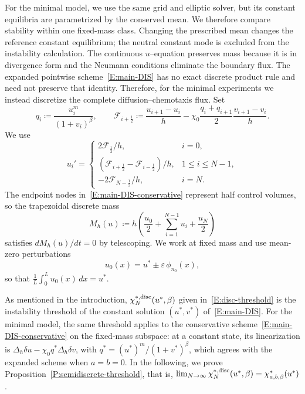 \documentclass[11pt]{article} %
\theoremstyle{remark}
\theoremstyle{remark}
\numberwithin{equation}{section}
\numberwithin{figure}{section}
\numberwithin{table}{section}
\begin{document}
For the minimal model, we use the same grid and elliptic solver, but its
constant equilibria are parametrized by the conserved mean. We therefore compare
stability within one fixed-mass class. Changing the prescribed mean changes the
reference constant equilibrium; the neutral constant mode is excluded from the
instability calculation. The continuous $u$--equation preserves mass because it
is in divergence form and the Neumann conditions eliminate the boundary flux.
The expanded pointwise scheme~\eqref{E:main-DIS} has no exact discrete product
rule and need not preserve that identity. Therefore, for the minimal experiments
we instead discretize the complete diffusion--chemotaxis flux. Set
\[
  q_i\coloneqq\frac{u_i^m}{(1+v_i)^\beta},
  \qquad
  \mathcal{F}_{i+\frac12}
  \coloneqq
  \frac{u_{i+1}-u_i}{h}
  -\chi_0\frac{q_i+q_{i+1}}{2}\frac{v_{i+1}-v_i}{h}.
\]
We use
\begin{equation}\label{E:main-DIS-conservative}
  u_i'=
  \begin{cases}
    2\mathcal{F}_{\frac12}/h,                                       & i=0,           \\
    \left(\mathcal{F}_{i+\frac12}-\mathcal{F}_{i-\frac12}\right)/h, & 1\le i\le N-1, \\
    -2\mathcal{F}_{N-\frac12}/h,                                    & i=N.
  \end{cases}
\end{equation}
The endpoint nodes in~\eqref{E:main-DIS-conservative} represent half control
volumes, so the trapezoidal discrete mass
\[
  M_h(u)\coloneqq
  h\left(\frac{u_0}{2}+\sum_{i=1}^{N-1}u_i+\frac{u_N}{2}\right)
\]
satisfies $dM_h(u)/dt = 0$ by telescoping.
We work at fixed mass and use mean-zero perturbations
\[
  u_0(x)=u^*\pm \varepsilon\,\phi_{n_0}(x),
\]
so that $\frac{1}{L}\int_0^L u_0(x)\,dx = u^*$.

As mentioned in the introduction, $\chi_N^{*,{\rm disc}}(u^*,\beta)$ given
in~\eqref{E:disc-threshold} is the instability threshold of the constant
solution $(u^*,v^*)$ of~\eqref{E:main-DIS}. For the minimal model, the same
threshold applies to the conservative scheme~\eqref{E:main-DIS-conservative} on
the fixed-mass subspace: at a constant state, its linearization is
$\Delta_h\delta u - \chi_0q^*\Delta_h\delta v$, with $q^* = (u^*)^m/(1 +
v^*)^\beta$, which agrees with the expanded scheme when $a = b = 0$. In the
following, we prove Proposition~\ref{P:semidiscrete-threshold}, that is,
$\lim_{N\to\infty} \chi_N^{*,{\rm disc}}(u^*,\beta) = \chi_{a,b,\beta}^*(u^*)$.
\end{document}
